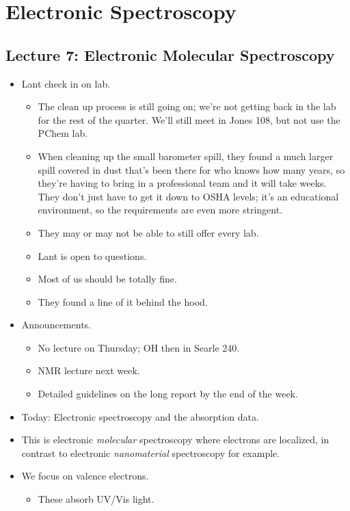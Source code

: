 \documentclass[../notes.tex]{subfiles}
\begin{document}
\chapter{Electronic Spectroscopy}
\section{Lecture 7: Electronic Molecular Spectroscopy}
\begin{itemize}
    \item {}Lant check in on lab.
    \begin{itemize}
        \item The clean up process is still going on; we're not getting back in the lab for the rest of the quarter. We'll still meet in Jones 108, but not use the PChem lab.
        \item When cleaning up the small barometer spill, they found a much larger spill covered in dust that's been there for who knows how many years, so they're having to bring in a professional team and it will take weeks. They don't just have to get it down to OSHA levels; it's an educational environment, so the requirements are even more stringent.
        \item They may or may not be able to still offer every lab.
        \item Lant is open to questions.
        \item Most of us should be totally fine.
        \item They found a line of it behind the hood.
    \end{itemize}
    \item Announcements.
    \begin{itemize}
        \item No lecture on Thursday; OH then in Searle 240.
        \item NMR lecture next week.
        \item Detailed guidelines on the long report by the end of the week.
    \end{itemize}
    \item Today: Electronic spectroscopy and the  absorption data.
    \item This is electronic \emph{molecular} spectroscopy where electrons are localized, in contrast to electronic \emph{nanomaterial} spectroscopy for example.
    \item We focus on valence electrons.
    \begin{itemize}
        \item These absorb UV/Vis light.

\end{itemize}
\end{itemize}
\end{document}
